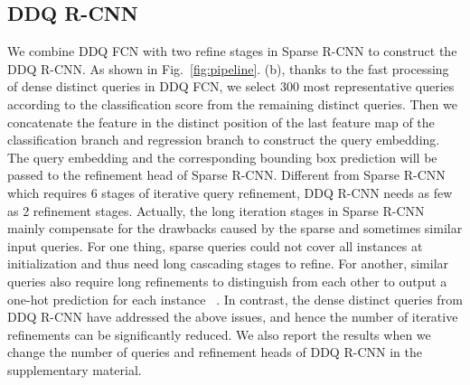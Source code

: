 \documentclass[10pt,twocolumn,letterpaper]{article}
\begin{document}
\subsection{DDQ R-CNN} We combine DDQ FCN with two refine stages in Sparse R-CNN to construct the DDQ R-CNN.  As shown in Fig.~\ref{fig:pipeline}. (b), thanks to the fast processing of dense distinct queries in DDQ FCN, we select 300 most representative queries according to the classification score from the remaining distinct queries. Then we concatenate the feature in the distinct position of the last feature map of the classification branch and regression branch to construct the query embedding. The query embedding and the corresponding bounding box prediction will be passed to the refinement head of Sparse R-CNN. Different from Sparse R-CNN which requires 6 stages of iterative query refinement, DDQ R-CNN needs as few as 2 refinement stages. Actually, the long iteration stages in Sparse R-CNN mainly compensate for the drawbacks caused by the sparse and sometimes similar input queries. For one thing, sparse queries could not cover all instances at initialization and thus need long cascading stages to refine. For another, similar queries also require long refinements to distinguish from each other to output a one-hot prediction for each instance ~\cite{carion2020end}. In contrast, the dense distinct queries from DDQ R-CNN have addressed the above issues, and hence the number of iterative refinements can be significantly reduced. We also report the results when we change the number of queries and refinement heads of DDQ R-CNN in the supplementary material. 
\end{document}
